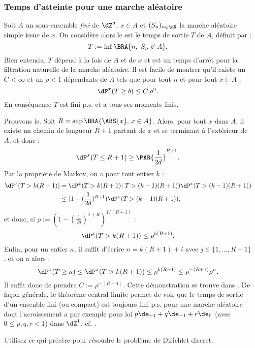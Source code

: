 {{%

%
\subsubsection{Temps d'atteinte pour une marche aléatoire}
%

Soit $A$ un sous-ensemble \emph{fini} de $\dZ^d$, $x\in A$ et
$(S_n)_{n\in\dN}$ la marche aléatoire simple issue de $x$.  On
considère alors le est le temps de sortie $T$ de $A$, définit par :
$$
T:=\inf\BRA{n,\;S_n\not\in A}.
$$
Bien entendu, $T$ dépend à la fois de $A$ et de $x$ et est un temps
d'arrêt pour la filtration naturelle de la marche aléatoire. Il est
facile de montrer qu'il existe un $C<\infty$ et un $\rho<1$ dépendants
de $A$ tels que pour tout $n$ et pour tout $x\in A$ :
$$
\dP^x(T\geq b) \leq C\,\rho^n.
$$
En conséquence $T$ est fini p.s. et a tous ses moments finis.

Prouvons le. Soit $R=\sup\BRA{\ABS{x},\,x\in A}$. Alors, pour tout $x$
dans $A$, il existe un chemin de longueur $R+1$ partant de $x$ et se
terminant à l'extérieur de $A$, et donc :
$$
\dP^x(T \leq R+1) \geq \PAR{\frac{1}{2d}}^{R+1}.
$$
Par la propriété de Markov, on a pour tout entier $k$ :
\begin{align*}
\dP^x(T>k(R+1))
&=\dP^x(T>k(R+1)\,\vert\,T>(k-1)(R+1)) \dP^x(T>(k-1)(R+1)) \\
&\leq (1-(\frac{1}{2d})^{R+1})\dP^x(T>(k-1)(R+1)),
\end{align*}
et donc, si $\rho:=(1-(\frac{1}{2d})^{1+R})^{1/(R+1)}$ :
$$
\dP^x(T>k(R+1)) \leq \rho^{k(R+1)}.
$$
Enfin, pour un entier $n$, il suffit d'écrire $n=k(R+1)+i$ avec
$j\in\{1,\ldots,R+1\}$, et on a alors :
$$
\dP^x(T\geq n) \leq \dP^x(T>k(R+1)) \leq \rho^{k(R+1)} \leq
\rho^{-(R+1)}\rho^n.
$$
Il suffit donc de prendre $C:=\rho^{-(R+1)}$.  Cette démonstration
se trouve dans \cite[Lemme 1.4.4]{lawler}.  De façon générale, le
théorème central limite permet de voir que le temps de sortie d'un
ensenble fini (ou compact) est toujours fini p.s.  pour une marche
aléatoire dont l'acroissement a par exemple pour loi
$p\de_{+1}+q\de_{-1}+r\de_0$ (avec $0\leq p,q,r<1$) dans $\dZ^1$, cf.
\cite[exercice 8.8 page 247]{cottrell-duhamel}.


\begin{exo}
Utilisez ce qui précère pour résoudre le problème de Dirichlet discret.
\end{exo}

}}
